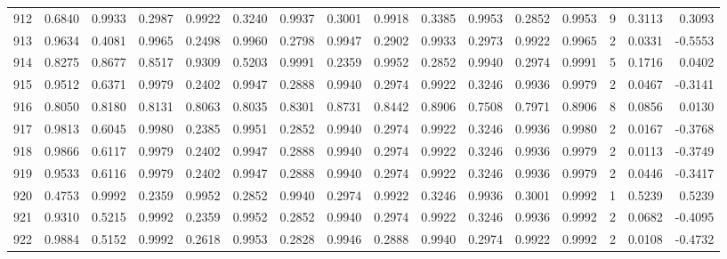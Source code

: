 \begin{tabular}{lrrrrrrrrrrrrrrr}
912 &      0.6840 &  0.9933 &  0.2987 &  0.9922 &  0.3240 &  0.9937 &  0.3001 &  0.9918 &  0.3385 &  0.9953 &   0.2852 &     0.9953 &      9 &                    0.3113 &                     0.3093 \\
913 &      0.9634 &  0.4081 &  0.9965 &  0.2498 &  0.9960 &  0.2798 &  0.9947 &  0.2902 &  0.9933 &  0.2973 &   0.9922 &     0.9965 &      2 &                    0.0331 &                    -0.5553 \\
914 &      0.8275 &  0.8677 &  0.8517 &  0.9309 &  0.5203 &  0.9991 &  0.2359 &  0.9952 &  0.2852 &  0.9940 &   0.2974 &     0.9991 &      5 &                    0.1716 &                     0.0402 \\
915 &      0.9512 &  0.6371 &  0.9979 &  0.2402 &  0.9947 &  0.2888 &  0.9940 &  0.2974 &  0.9922 &  0.3246 &   0.9936 &     0.9979 &      2 &                    0.0467 &                    -0.3141 \\
916 &      0.8050 &  0.8180 &  0.8131 &  0.8063 &  0.8035 &  0.8301 &  0.8731 &  0.8442 &  0.8906 &  0.7508 &   0.7971 &     0.8906 &      8 &                    0.0856 &                     0.0130 \\
917 &      0.9813 &  0.6045 &  0.9980 &  0.2385 &  0.9951 &  0.2852 &  0.9940 &  0.2974 &  0.9922 &  0.3246 &   0.9936 &     0.9980 &      2 &                    0.0167 &                    -0.3768 \\
918 &      0.9866 &  0.6117 &  0.9979 &  0.2402 &  0.9947 &  0.2888 &  0.9940 &  0.2974 &  0.9922 &  0.3246 &   0.9936 &     0.9979 &      2 &                    0.0113 &                    -0.3749 \\
919 &      0.9533 &  0.6116 &  0.9979 &  0.2402 &  0.9947 &  0.2888 &  0.9940 &  0.2974 &  0.9922 &  0.3246 &   0.9936 &     0.9979 &      2 &                    0.0446 &                    -0.3417 \\
920 &      0.4753 &  0.9992 &  0.2359 &  0.9952 &  0.2852 &  0.9940 &  0.2974 &  0.9922 &  0.3246 &  0.9936 &   0.3001 &     0.9992 &      1 &                    0.5239 &                     0.5239 \\
921 &      0.9310 &  0.5215 &  0.9992 &  0.2359 &  0.9952 &  0.2852 &  0.9940 &  0.2974 &  0.9922 &  0.3246 &   0.9936 &     0.9992 &      2 &                    0.0682 &                    -0.4095 \\
922 &      0.9884 &  0.5152 &  0.9992 &  0.2618 &  0.9953 &  0.2828 &  0.9946 &  0.2888 &  0.9940 &  0.2974 &   0.9922 &     0.9992 &      2 &                    0.0108 &                    -0.4732 \\

\end{tabular}
